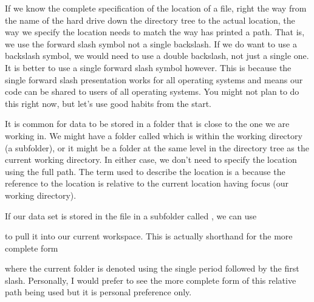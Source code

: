 If we know the complete specification of the location of a file, right the way from the name of the hard drive down the directory tree to the actual location, the way we specify the location needs to match the way \R{} has printed a path. That is, we use the forward slash symbol not a single backslash. If we do want to use a backslash symbol, we would need to use a double backslash, not just a single one. It is better to use a single forward slash symbol however. This is because the single forward slash presentation works for all operating systems and means our code can be shared to users of all operating systems. You might not plan to do this right now, but let's use good habits from the start. 
 
It is common for data to be stored in a folder that is close to the one we are working in. We might have a folder called  which is within the working directory (a subfolder), or it might be a folder at the same level in the directory tree as the current working directory. In either case, we don't need to specify the location using the full path. The term used to describe the location is a  because the reference to the location is relative to the current location having focus (our working directory).  
 
If our data set is stored in the file  in a  subfolder called , we can use  
\begin{knitrout}
\color{fgcolor}\begin{kframe}
\begin{alltt}
 \hlkwb{=} \hlstd{(}\hlstd{)}
\end{alltt}
\end{kframe}
\end{knitrout}
to pull it into our current workspace. This is actually shorthand for the more complete form 
\begin{knitrout}
\color{fgcolor}\begin{kframe}
\begin{alltt}
 \hlkwb{=} \hlstd{(}\hlstd{)}
\end{alltt}
\end{kframe}
\end{knitrout}
where the current folder is denoted using the single period followed by the first slash. Personally, I would prefer to see the more complete form of this relative path being used but it is personal preference only. 
 

